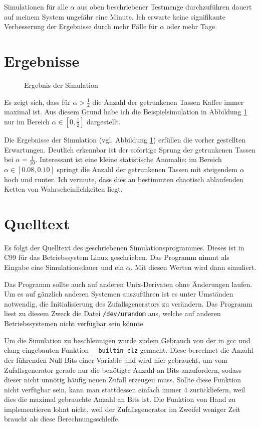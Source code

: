 \documentclass{scrartcl}
\begin{document}
Simulationen für alle $\alpha$ aus oben beschriebener Testmenge durchzuführen
dauert auf meinem System ungefähr eine Minute. Ich erwarte keine signifikante
Verbesserung der Ergebnisse durch mehr Fälle für $\alpha$ oder mehr Tage.

\section{Ergebnisse}
\begin{figure}
\begin{center}

\end{center}
\caption{Ergebnis der Simulation}
\label{simulation}
\end{figure}

Es zeigt sich, dass für $\alpha>\frac12$ die Anzahl der getrunkenen Tassen
Kaffee immer maximal ist. Aus diesem Grund habe ich die Beispielsimulation
in Abbildung \ref{simulation} nur im Bereich $\alpha\in[0,\frac12]$ dargestellt.

Die Ergebnisse der Simulation (vgl. Abbildung \ref{simulation}) erfüllen die
vorher gestellten Erwartungen. Deutlich erkennbar ist der sofortige Sprung der
getrunkenen Tassen bei $\alpha=\frac1{10}$. Interessant ist eine kleine
statistische Anomalie: im Bereich $\alpha\in[0.08,0.10]$ springt die Anzahl der
getrunkenen Tassen mit steigendem $\alpha$ hoch und runter. Ich vermute, dass
dies an bestimmten chaotisch ablaufenden Ketten von Wahrscheinlichkeiten liegt.

\newpage\appendix
\section{Quelltext}
Es folgt der Quelltext des geschriebenen Simulationsprogrammes. Dieses ist in
C99 für das Betriebssystem Linux geschrieben. Das Programm nimmt als Eingabe
eine Simulationsdauer und ein $\alpha$. Mit diesen Werten wird dann simuliert.

Das Programm sollte auch auf anderen Unix-Derivaten ohne Änderungen laufen. Um
es auf gänzlich anderen Systemen auszuführen ist es unter Umständen notwendig,
die Initialisierung des Zufallsgenerators zu verändern. Das Programm liest zu
diesem Zweck die Datei \texttt{/dev/urandom} aus, welche auf anderen
Betriebssystemen nicht verfügbar sein könnte.

Um die Simulation zu beschleunigen wurde zudem Gebrauch von der in gcc und clang
eingebauten Funktion \texttt{\_\_builtin\_clz} gemacht. Diese berechnet die
Anzahl der führenden Null-Bits einer Variable und wird hier gebraucht, um vom
Zufallsgenerator gerade nur die benötigte Anzahl an Bits anzufordern, sodass
dieser nicht unnötig häufig neuen Zufall erzeugen muss. Sollte diese Funktion
nicht verfügbar sein, kann man stattdessen einfach immer 4 zurückliefern, weil
dies die maximal gebrauchte Anzahl an Bits ist. Die Funktion von Hand zu
implementieren lohnt nicht, weil der Zufallsgenerator im Zweifel weniger Zeit
braucht als diese Berechnungsschleife.


\end{document}
